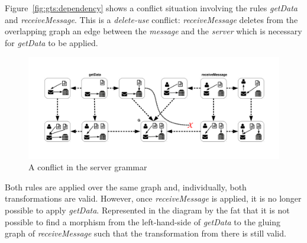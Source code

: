 \begin{example}
  Figure~\ref{fig:gts:dependency} shows a conflict situation involving the rules \emph{getData} and \emph{receiveMessage}. This is a \emph{delete-use} conflict: \emph{receiveMessage} deletes from the overlapping graph an edge between the \emph{message} and the \emph{server} which is necessary for \emph{getData} to be applied.

\begin{figure}[!ht]
  \centering
  \includegraphics[scale=0.5]{images/gts/conflict}
  \caption{A conflict in the server grammar}\label{fig:gts:conflict}
\end{figure}

  Both rules are applied over the same graph and, individually, both transformations are valid. However, once \emph{receiveMessage} is applied, it is no longer possible to apply \emph{getData}. Represented in the diagram by the fat that it is not possible to find a morphism from the left-hand-side of \emph{getData} to the gluing graph of \emph{receiveMessage} such that the transformation from there is still valid.
\end{example}
